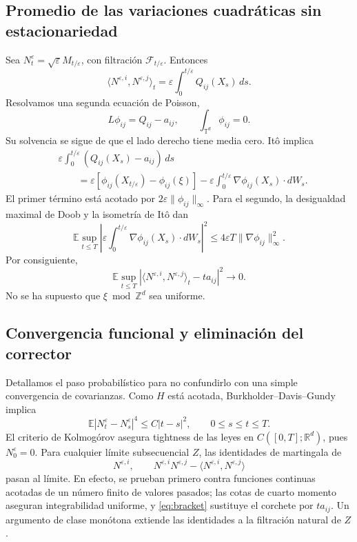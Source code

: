 \documentclass[11pt,a4paper]{article}
\theoremstyle{remark}\newtheorem{remark}{Observación}
\newcommand{\R}{\mathbb R}
\newcommand{\T}{\mathbb T}
\newcommand{\E}{\mathbb E}
\begin{document}
\subsection{Promedio de las variaciones cuadráticas sin estacionariedad}
Sea $N_t^\varepsilon=\sqrt\varepsilon M_{t/\varepsilon}$, con filtración $\mathcal F_{t/\varepsilon}$. Entonces
\[
 \langle N^{\varepsilon,i},N^{\varepsilon,j}\rangle_t
 =\varepsilon\int_0^{t/\varepsilon}Q_{ij}(X_s)\,ds.
\]
Resolvamos una segunda ecuación de Poisson,
\[
 L\phi_{ij}=Q_{ij}-a_{ij},\qquad\int_{\T^d}\phi_{ij}=0.
\]
Su solvencia se sigue de que el lado derecho tiene media cero. Itô implica
\begin{align*}
 &\varepsilon\int_0^{t/\varepsilon}(Q_{ij}(X_s)-a_{ij})\,ds\\
 &\qquad=\varepsilon[\phi_{ij}(X_{t/\varepsilon})-\phi_{ij}(\xi)]
 -\varepsilon\int_0^{t/\varepsilon}\nabla\phi_{ij}(X_s)\cdot dW_s.
\end{align*}
El primer término está acotado por $2\varepsilon\|\phi_{ij}\|_\infty$. Para el segundo, la desigualdad maximal de Doob y la isometría de Itô dan
\[
 \E\sup_{t\leq T}\left|\varepsilon\int_0^{t/\varepsilon}
 \nabla\phi_{ij}(X_s)\cdot dW_s\right|^2
 \leq4\varepsilon T\|\nabla\phi_{ij}\|_\infty^2.
\]
Por consiguiente,
\begin{equation}\label{eq:bracket}
 \E\sup_{t\leq T}\left|
 \langle N^{\varepsilon,i},N^{\varepsilon,j}\rangle_t-ta_{ij}
 \right|^2\longrightarrow0.
\end{equation}
No se ha supuesto que $\xi\bmod\mathbb Z^d$ sea uniforme.

\subsection{Convergencia funcional y eliminación del corrector}
Detallamos el paso probabilístico para no confundirlo con una simple convergencia de covarianzas. Como $H$ está acotada, Burkholder--Davis--Gundy implica
\[
 \E|N_t^\varepsilon-N_s^\varepsilon|^4\leq C|t-s|^2,
 \qquad 0\leq s\leq t\leq T.
\]
El criterio de Kolmogórov asegura tightness de las leyes en $C([0,T];\R^d)$, pues $N_0^\varepsilon=0$. Para cualquier límite subsecuencial $Z$, las identidades de martingala de
\[
 N^{\varepsilon,i},\qquad
 N^{\varepsilon,i}N^{\varepsilon,j}
 -\langle N^{\varepsilon,i},N^{\varepsilon,j}\rangle
\]
pasan al límite. En efecto, se prueban primero contra funciones continuas acotadas de un número finito de valores pasados; las cotas de cuarto momento aseguran integrabilidad uniforme, y \eqref{eq:bracket} sustituye el corchete por $ta_{ij}$. Un argumento de clase monótona extiende las identidades a la filtración natural de $Z$.
\end{document}
